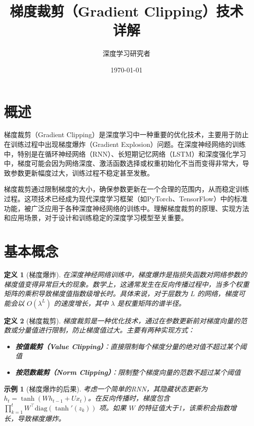\documentclass{article}
\title{\textbf{梯度裁剪（Gradient Clipping）技术详解}}
\author{深度学习研究者}
\date{\today}
\newtheorem{definition}{定义}[section]
\newtheorem{example}{示例}[section]
\begin{document}
\maketitle

\tableofcontents
\newpage

\section{概述}
梯度裁剪（Gradient Clipping）是深度学习中一种重要的优化技术，主要用于防止在训练过程中出现梯度爆炸（Gradient Explosion）问题。在深度神经网络的训练中，特别是在循环神经网络（RNN）、长短期记忆网络（LSTM）和深度强化学习中，梯度可能会因为网络深度、激活函数选择或权重初始化不当而变得非常大，导致参数更新幅度过大，训练过程不稳定甚至发散。

梯度裁剪通过限制梯度的大小，确保参数更新在一个合理的范围内，从而稳定训练过程。这项技术已经成为现代深度学习框架（如PyTorch、TensorFlow）中的标准功能，被广泛应用于各种深度神经网络的训练中。理解梯度裁剪的原理、实现方法和应用场景，对于设计和训练稳定的深度学习模型至关重要。

\section{基本概念}

\begin{definition}[梯度爆炸]
在深度神经网络训练中，梯度爆炸是指损失函数对网络参数的梯度值变得异常巨大的现象。数学上，这通常发生在反向传播过程中，当多个权重矩阵的乘积导致梯度值指数级增长时。具体来说，对于层数为 $L$ 的网络，梯度可能会以 $O(\lambda^L)$ 的速度增长，其中 $\lambda$ 是权重矩阵的谱半径。
\end{definition}

\begin{definition}[梯度裁剪]
梯度裁剪是一种优化技术，通过在参数更新前对梯度向量的范数或分量值进行限制，防止梯度值过大。主要有两种实现方式：
\begin{itemize}
    \item \textbf{按值裁剪（Value Clipping）}：直接限制每个梯度分量的绝对值不超过某个阈值
    \item \textbf{按范数裁剪（Norm Clipping）}：限制整个梯度向量的范数不超过某个阈值
\end{itemize}
\end{definition}

\begin{example}[梯度爆炸的后果]
考虑一个简单的RNN，其隐藏状态更新为 $h_t = \tanh(W h_{t-1} + U x_t)$。在反向传播时，梯度包含 $\prod_{k=1}^t W^\top \text{diag}(\tanh'(z_k))$ 项。如果 $W$ 的特征值大于1，该乘积会指数增长，导致梯度爆炸。
\end{example}
\end{document}
